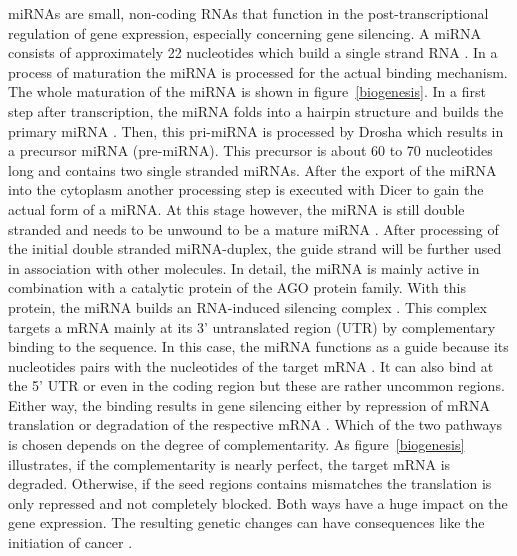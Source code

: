 \documentclass[12pt]{article}
\begin{document}
miRNAs are small, non-coding RNAs that function in the post-transcriptional regulation of gene expression, especially concerning gene silencing. A miRNA consists of approximately 22 nucleotides which build a single strand RNA \cite{Bartel}. In a process of maturation the miRNA is processed for the actual binding mechanism. The whole maturation of the miRNA is shown in figure~\ref{biogenesis}. In a first step after transcription, the miRNA folds into a hairpin structure and builds the primary miRNA \cite{Macfarlane}. Then, this pri-miRNA is processed by Drosha which results in a precursor miRNA (pre-miRNA). This precursor is about 60 to 70 nucleotides long and contains two single stranded miRNAs. After the export of the miRNA into the cytoplasm another processing step is executed with Dicer to gain the actual form of a miRNA. At this stage however, the miRNA is still double stranded and needs to be unwound to be a mature miRNA \cite{Macfarlane}. After processing of the initial double stranded miRNA-duplex, the guide strand will be further used in association with other molecules. In detail, the miRNA is mainly active in combination with a catalytic protein of the AGO protein family. With this protein, the miRNA builds an RNA-induced silencing complex \cite{Ha}. This complex targets a mRNA mainly at its 3' untranslated region (UTR) by complementary binding to the sequence. In this case, the miRNA functions as a guide because its nucleotides pairs with the nucleotides of the target mRNA \cite{Macfarlane}. It can also bind at the 5' UTR or even in the coding region but these are rather uncommon regions. Either way, the binding results in gene silencing either by repression of mRNA translation or degradation of the respective mRNA \cite{Enright}. Which of the two pathways is chosen depends on the degree of complementarity. As figure~\ref{biogenesis} illustrates, if the complementarity is nearly perfect, the target mRNA is degraded. Otherwise, if the seed regions contains mismatches the translation is only repressed and not completely blocked. Both ways have a huge impact on the gene expression. The resulting genetic changes can have consequences like the initiation of cancer \cite{Macfarlane}.\\
\end{document}
